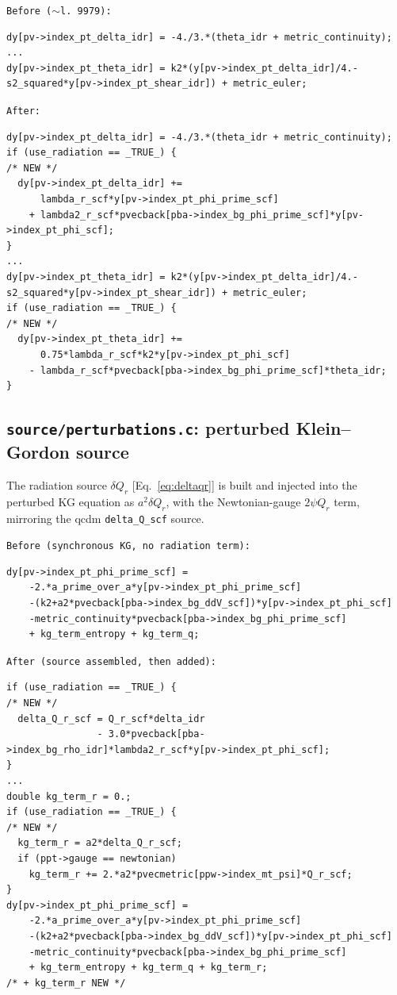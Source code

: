 \documentclass[11pt,a4paper,english,twoside]{article}
\newcommand{\codefile}[1]{\smallskip\noindent\texttt{\small #1}\par\nopagebreak}
\begin{document}
\codefile{Before ($\sim$l.\,9979):}
\begin{lstlisting}[style=cstyle]
dy[pv->index_pt_delta_idr] = -4./3.*(theta_idr + metric_continuity);
...
dy[pv->index_pt_theta_idr] = k2*(y[pv->index_pt_delta_idr]/4.-s2_squared*y[pv->index_pt_shear_idr]) + metric_euler;
\end{lstlisting}
\codefile{After:}
\begin{lstlisting}[style=cstyle]
dy[pv->index_pt_delta_idr] = -4./3.*(theta_idr + metric_continuity);
if (use_radiation == _TRUE_) {                                       /* NEW */
  dy[pv->index_pt_delta_idr] +=
      lambda_r_scf*y[pv->index_pt_phi_prime_scf]
    + lambda2_r_scf*pvecback[pba->index_bg_phi_prime_scf]*y[pv->index_pt_phi_scf];
}
...
dy[pv->index_pt_theta_idr] = k2*(y[pv->index_pt_delta_idr]/4.-s2_squared*y[pv->index_pt_shear_idr]) + metric_euler;
if (use_radiation == _TRUE_) {                                       /* NEW */
  dy[pv->index_pt_theta_idr] +=
      0.75*lambda_r_scf*k2*y[pv->index_pt_phi_scf]
    - lambda_r_scf*pvecback[pba->index_bg_phi_prime_scf]*theta_idr;
}
\end{lstlisting}

\subsection{\texttt{source/perturbations.c}: perturbed Klein--Gordon source}

The radiation source $\delta Q_r$ [Eq.~\eqref{eq:deltaqr}] is built and injected
into the perturbed KG equation as $a^2\delta Q_r$, with the Newtonian-gauge
$2\psi Q_r$ term, mirroring the qcdm \texttt{delta\_Q\_scf} source.

\codefile{Before (synchronous KG, no radiation term):}
\begin{lstlisting}[style=cstyle]
dy[pv->index_pt_phi_prime_scf] =
    -2.*a_prime_over_a*y[pv->index_pt_phi_prime_scf]
    -(k2+a2*pvecback[pba->index_bg_ddV_scf])*y[pv->index_pt_phi_scf]
    -metric_continuity*pvecback[pba->index_bg_phi_prime_scf]
    + kg_term_entropy + kg_term_q;
\end{lstlisting}
\codefile{After (source assembled, then added):}
\begin{lstlisting}[style=cstyle]
if (use_radiation == _TRUE_) {                                       /* NEW */
  delta_Q_r_scf = Q_r_scf*delta_idr
                - 3.0*pvecback[pba->index_bg_rho_idr]*lambda2_r_scf*y[pv->index_pt_phi_scf];
}
...
double kg_term_r = 0.;
if (use_radiation == _TRUE_) {                                       /* NEW */
  kg_term_r = a2*delta_Q_r_scf;
  if (ppt->gauge == newtonian)
    kg_term_r += 2.*a2*pvecmetric[ppw->index_mt_psi]*Q_r_scf;
}
dy[pv->index_pt_phi_prime_scf] =
    -2.*a_prime_over_a*y[pv->index_pt_phi_prime_scf]
    -(k2+a2*pvecback[pba->index_bg_ddV_scf])*y[pv->index_pt_phi_scf]
    -metric_continuity*pvecback[pba->index_bg_phi_prime_scf]
    + kg_term_entropy + kg_term_q + kg_term_r;                       /* + kg_term_r NEW */
\end{lstlisting}
\end{document}
